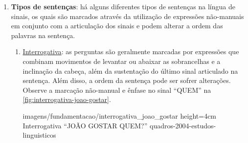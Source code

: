 \begin{enumerate}



    \item \textbf{Tipos de sentenças}: há alguns diferentes tipos de sentenças na língua de sinais, os quais são marcados através da utilização de expressões não-manuais em conjunto com a articulação dos sinais e podem alterar a ordem das palavras na sentença.
    

    \begin{enumerate}
        \item \underline{Interrogativa}: as perguntas são geralmente marcadas por expressões que combinam movimentos de levantar ou abaixar as sobrancelhas e a inclinação da cabeça, além da sustentação do último sinal articulado na sentença. Além disso, a ordem da sentença pode ser sofrer alterações. Observe a marcação não-manual e ênfase no sinal ``QUEM'' na \autoref{fig:interrogativa-joao-gostar}.
        
            {imagens/fundamentacao/interrogativa_joao_gostar} %
            {height=4cm} %
            {Interrogativa ``JOÃO GOSTAR QUEM?''} %
            {quadros-2004-estudos-linguisticos} %
    


\end{enumerate}
\end{enumerate}
